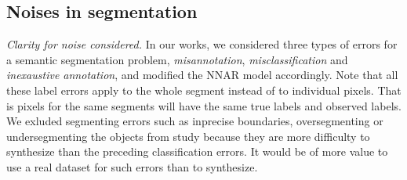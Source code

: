 \subsection{Noises in segmentation}
\label{subsec:noises}
\noindent \textit{Clarity for noise considered.}
\noindent
In our works, we considered three types of errors for a semantic segmentation problem, \textit{misannotation}, \textit{misclassification} and \textit{inexaustive annotation}, and modified the NNAR model accordingly.
Note that all these label errors apply to the whole segment instead of to individual pixels.
That is pixels for the same segments will have the same true labels and observed labels.
We exluded segmenting errors such as inprecise boundaries, oversegmenting or undersegmenting the objects from study because they are more difficulty to synthesize than the preceding classification errors.
It would be of more value to use a real dataset for such errors than to synthesize.




